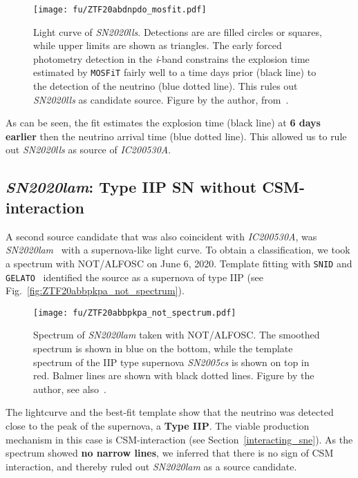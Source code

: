 \begin{figure}[htb]
    \texttt{[image: fu/ZTF20abdnpdo\_mosfit.pdf]}
    \caption[\emph{SN2020lls} light curve fit]{Light curve of \emph{SN2020lls}. Detections are are filled circles or squares, while upper limits are shown as triangles. The early forced photometry detection in the \textit{i}-band constrains the explosion time estimated by \texttt{MOSFiT} fairly well to a time days prior (black line) to the detection of the neutrino (blue dotted line). This rules out \emph{SN2020lls} as candidate source. Figure by the author, from~\cite{Stein2023a}.}
\end{figure}
As can be seen, the fit estimates the explosion time (black line) at \textbf{6 days earlier} then the neutrino arrival time (blue dotted line). This allowed us to rule out \emph{SN2020lls} as source of \emph{IC200530A}.

\subsection{\emph{SN2020lam}: Type IIP SN without CSM-interaction}\label{SN2020lam}
A second source candidate that was also coincident with \emph{IC200530A}, was \emph{SN2020lam}~ with a supernova-like light curve. To obtain a classification, we took a spectrum with NOT/ALFOSC on June 6, 2020. Template fitting with \texttt{SNID} and \texttt{GELATO}~ identified the source as a supernova of type IIP (see Fig.~\ref{fig:ZTF20abbpkpa_not_spectrum}).

\begin{figure}[h!]
    \texttt{[image: fu/ZTF20abbpkpa\_not\_spectrum.pdf]}
    \caption[\emph{SN2020lam} spectrum]{Spectrum of \emph{SN2020lam} taken with NOT/ALFOSC. The smoothed spectrum is shown in blue on the bottom, while the template spectrum of the IIP type supernova \emph{SN2005cs} is shown on top in red. Balmer lines are shown with black dotted lines. Figure by the author, see also~\cite{Stein2023a}.}
\end{figure}

The lightcurve and the best-fit template show that the neutrino was detected close to the peak of the supernova, a \textbf{Type IIP}. The viable production mechanism in this case is CSM-interaction (see Section~\ref{interacting_sne}). As the spectrum showed \textbf{no narrow lines}, we inferred that there is no sign of CSM interaction, and thereby ruled out \emph{SN2020lam} as a source candidate.

